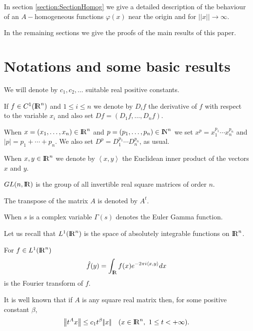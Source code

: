 \documentclass[12pt,a4paper]{amsart}
\begin{document}
In section \ref{section:SectionHomog} we give a detailed description of
the behaviour of an $A-$homogeneous functions ${\varphi}(x)$
near the origin and for ${\left|\!\left|{x}\right|\!\right|}\to\infty$.

In the remaining sections we give the proofs of the main results of this paper.

\section{\label{section:SectionBasic}Notations and some basic results}
We will denote by ${c}_1,{c}_2,\ldots$ suitable real positive constants.

If $f\in C^1({{\rm I\kern-.185em R}}^{n})$ and $1\leq i\leq{n}$ we denote by ${D}_if$ the derivative of
$f$ with respect to the variable ${x}_i$
and also set ${D} f=({D}_1 f,\ldots,{D}_{n} f).$

When ${x}=({x}_1,\ldots,{x}_{n})\in{{\rm I\kern-.185em R}}^{n}$
and ${p}=({p}_1,\ldots,{p}_{n})\in{{\rm I\kern-.185em N}}^{n}$
we set ${x}^{p}=
{x}_1^{{p}_1}\cdots{x}_{n}^{{p}_{n}}$
and $|{p}|={p}_1+\cdots+{p}_{n}$.
We also set
${D}^{p}
={D}_1^{{p}_1}\cdots{D}_{n}^{{p}_{n}}$,
as usual.

When $x,y\in{{\rm I\kern-.185em R}}^{n}$ we denote by ${\left<{x},{y}\right>}$
the Euclidean inner product of the vectors $x$ and $y$.

$GL({n},{{\rm I\kern-.185em R}})$ is the group of all invertible
real square matrices of order ${n}$.

The transpose of the matrix ${A}$ is denoted by
${{\left.{{A}}\right.}^t}$.

When ${s}$ is a complex variable $\Gamma({s})$ denotes the
Euler Gamma function.

Let us recall that $L^1({{\rm I\kern-.185em R}}^{n})$ is the space of absolutely integrable
functions on ${{\rm I\kern-.185em R}}^{n}$.

For $f\in L^1({{\rm I\kern-.185em R}}^{n})$
\begin{equation}\nonumber
\hat{f}(y)=\int_{{\rm I\kern-.185em R}} f(x)e^{-2\pi i{\left<{x},{y}\right>}}dx
\end{equation}
is the Fourier transform of $f$.

It is well known that if ${A}$ is any square real matrix
then, for some positive constant ${\beta}$,
\begin{equation}\nonumber	{\left|\!\left|{{t}^{A}{x}}\right|\!\right|}
\leq{c}_1{t}^{\beta}{\left|\!\left|{x}\right|\!\right|}
\quad({x}\in{{\rm I\kern-.185em R}}^{n},\ 1\leq{t}<+\infty).
\end{equation}	
\end{document}

